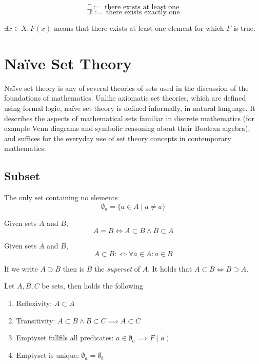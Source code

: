 \begin{definition}
   \[\exists :=~\text{there exists at least one}\]
   \[\exists! :=~\text{there exists exactly one}\]
\end{definition}
\begin{example}
   \(\exists x \in X: F(x)\) means that there exists at least one element for which \(F\) is true.
\end{example}

\section{Na\"ive Set Theory}
Na\"ive set theory is any of several theories of sets used in the discussion of the foundations of mathematics.
Unlike axiomatic set theories, which are defined using formal logic, na\"ive set theory is defined informally, in natural language.
It describes the aspects of mathematical sets familiar in discrete mathematics (for example Venn diagrams and symbolic reasoning about their Boolean algebra), and suffices for the everyday use of set theory concepts in contemporary mathematics.

\subsection{Subset}
\begin{definition}[Emptyset]\label{def:emptyset}
   The only set containing no elements
   \[\emptyset_a = \{a \in A \mid a \neq a\}\]
\end{definition}

\begin{definition}
   Given sets \(A\) and \(B\),
   \[A = B \iff A \subset B \land B \subset A\]
\end{definition}

\begin{definition}[Subset]
   Given sets \(A\) and \(B\),
   \[A \subset B :\iff \forall a \in A: a \in B\]
\end{definition}
\begin{remark}
   If we write \(A \supset B\) then is \(B\) the \emph{superset} of \(A\).
   It holds that \(A \subset B \iff B \supset A\).
\end{remark}

\begin{proposition}
   Let \(A, B, C\) be sets, then holds the following
   \begin{enumerate}[label=\roman*, align=Center]
      \item Reflexivity: \(A \subset A\)
      \item Transitivity: \(A \subset B \land B \subset C \implies A \subset C\)
      \item Emptyset fullfils all predicates: \(a \in \emptyset_a \implies F(a)\)
      \item Emptyset is unique: \(\emptyset_a = \emptyset_b\)
   \end{enumerate}
\end{proposition}

